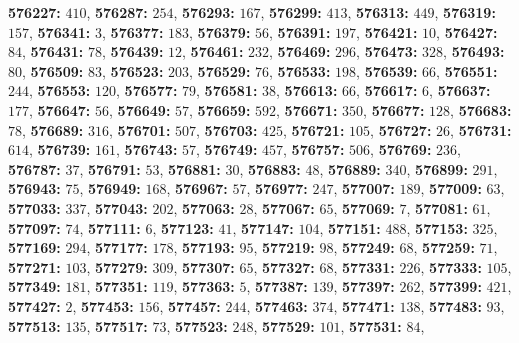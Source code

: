 \textsf{\bfseries 576227:} $410$, \textsf{\bfseries 576287:} $254$, \textsf{\bfseries 576293:} $167$, \textsf{\bfseries 576299:} $413$, \textsf{\bfseries 576313:} $449$, \textsf{\bfseries 576319:} $157$, \textsf{\bfseries 576341:} $3$, \textsf{\bfseries 576377:} $183$, \textsf{\bfseries 576379:} $56$, \textsf{\bfseries 576391:} $197$, \textsf{\bfseries 576421:} $10$, \textsf{\bfseries 576427:} $84$, \textsf{\bfseries 576431:} $78$, \textsf{\bfseries 576439:} $12$, \textsf{\bfseries 576461:} $232$, \textsf{\bfseries 576469:} $296$, \textsf{\bfseries 576473:} $328$, \textsf{\bfseries 576493:} $80$, \textsf{\bfseries 576509:} $83$, \textsf{\bfseries 576523:} $203$, \textsf{\bfseries 576529:} $76$, \textsf{\bfseries 576533:} $198$, \textsf{\bfseries 576539:} $66$, \textsf{\bfseries 576551:} $244$, \textsf{\bfseries 576553:} $120$, \textsf{\bfseries 576577:} $79$, \textsf{\bfseries 576581:} $38$, \textsf{\bfseries 576613:} $66$, \textsf{\bfseries 576617:} $6$, \textsf{\bfseries 576637:} $177$, \textsf{\bfseries 576647:} $56$, \textsf{\bfseries 576649:} $57$, \textsf{\bfseries 576659:} $592$, \textsf{\bfseries 576671:} $350$, \textsf{\bfseries 576677:} $128$, \textsf{\bfseries 576683:} $78$, \textsf{\bfseries 576689:} $316$, \textsf{\bfseries 576701:} $507$, \textsf{\bfseries 576703:} $425$, \textsf{\bfseries 576721:} $105$, \textsf{\bfseries 576727:} $26$, \textsf{\bfseries 576731:} $614$, \textsf{\bfseries 576739:} $161$, \textsf{\bfseries 576743:} $57$, \textsf{\bfseries 576749:} $457$, \textsf{\bfseries 576757:} $506$, \textsf{\bfseries 576769:} $236$, \textsf{\bfseries 576787:} $37$, \textsf{\bfseries 576791:} $53$, \textsf{\bfseries 576881:} $30$, \textsf{\bfseries 576883:} $48$, \textsf{\bfseries 576889:} $340$, \textsf{\bfseries 576899:} $291$, \textsf{\bfseries 576943:} $75$, \textsf{\bfseries 576949:} $168$, \textsf{\bfseries 576967:} $57$, \textsf{\bfseries 576977:} $247$, \textsf{\bfseries 577007:} $189$, \textsf{\bfseries 577009:} $63$, \textsf{\bfseries 577033:} $337$, \textsf{\bfseries 577043:} $202$, \textsf{\bfseries 577063:} $28$, \textsf{\bfseries 577067:} $65$, \textsf{\bfseries 577069:} $7$, \textsf{\bfseries 577081:} $61$, \textsf{\bfseries 577097:} $74$, \textsf{\bfseries 577111:} $6$, \textsf{\bfseries 577123:} $41$, \textsf{\bfseries 577147:} $104$, \textsf{\bfseries 577151:} $488$, \textsf{\bfseries 577153:} $325$, \textsf{\bfseries 577169:} $294$, \textsf{\bfseries 577177:} $178$, \textsf{\bfseries 577193:} $95$, \textsf{\bfseries 577219:} $98$, \textsf{\bfseries 577249:} $68$, \textsf{\bfseries 577259:} $71$, \textsf{\bfseries 577271:} $103$, \textsf{\bfseries 577279:} $309$, \textsf{\bfseries 577307:} $65$, \textsf{\bfseries 577327:} $68$, \textsf{\bfseries 577331:} $226$, \textsf{\bfseries 577333:} $105$, \textsf{\bfseries 577349:} $181$, \textsf{\bfseries 577351:} $119$, \textsf{\bfseries 577363:} $5$, \textsf{\bfseries 577387:} $139$, \textsf{\bfseries 577397:} $262$, \textsf{\bfseries 577399:} $421$, \textsf{\bfseries 577427:} $2$, \textsf{\bfseries 577453:} $156$, \textsf{\bfseries 577457:} $244$, \textsf{\bfseries 577463:} $374$, \textsf{\bfseries 577471:} $138$, \textsf{\bfseries 577483:} $93$, \textsf{\bfseries 577513:} $135$, \textsf{\bfseries 577517:} $73$, \textsf{\bfseries 577523:} $248$, \textsf{\bfseries 577529:} $101$, \textsf{\bfseries 577531:} $84$, 

